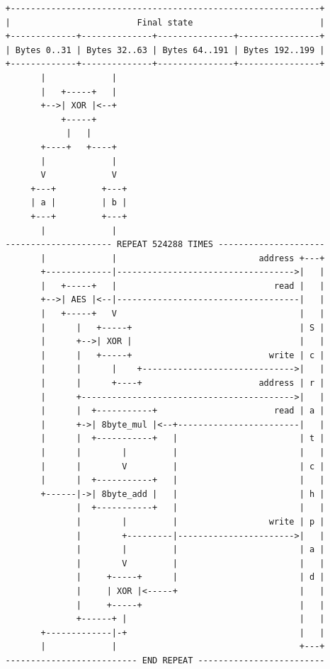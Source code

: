 \documentclass[
]{article}
\begin{document}
\begin{verbatim}
   +-------------------------------------------------------------+
   |                         Final state                         |
   +-------------+--------------+---------------+----------------+
   | Bytes 0..31 | Bytes 32..63 | Bytes 64..191 | Bytes 192..199 |
   +-------------+--------------+---------------+----------------+
          |             |
          |   +-----+   |
          +-->| XOR |<--+
              +-----+
               |   |
          +----+   +----+
          |             |
          V             V
        +---+         +---+
        | a |         | b |
        +---+         +---+
          |             |
   --------------------- REPEAT 524288 TIMES ---------------------
          |             |                            address +---+
          +-------------|----------------------------------->|   |
          |   +-----+   |                               read |   |
          +-->| AES |<--|------------------------------------|   |
          |   +-----+   V                                    |   |
          |      |   +-----+                                 | S |
          |      +-->| XOR |                                 |   |
          |      |   +-----+                           write | c |
          |      |      |    +------------------------------>|   |
          |      |      +----+                       address | r |
          |      +------------------------------------------>|   |
          |      |  +-----------+                       read | a |
          |      +->| 8byte_mul |<--+------------------------|   |
          |      |  +-----------+   |                        | t |
          |      |        |         |                        |   |
          |      |        V         |                        | c |
          |      |  +-----------+   |                        |   |
          +------|->| 8byte_add |   |                        | h |
                 |  +-----------+   |                        |   |
                 |        |         |                  write | p |
                 |        +---------|----------------------->|   |
                 |        |         |                        | a |
                 |        V         |                        |   |
                 |     +-----+      |                        | d |
                 |     | XOR |<-----+                        |   |
                 |     +-----+                               |   |
                 +------+ |                                  |   |
          +-------------|-+                                  |   |
          |             |                                    +---+
   -------------------------- END REPEAT -------------------------
\end{verbatim}
\end{document}
